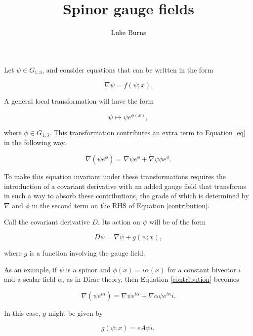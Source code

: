 \documentclass{article}
\title{Spinor gauge fields}
\author{Luke Burns}
\begin{document}
\maketitle

Let $\psi \in G_{1,3}$, and consider equations that can be written in the form

\begin{equation}
  \nabla \psi = f(\psi; x).\label{eq}
\end{equation}

A general local transformation will have the form

\begin{equation}
  \psi \mapsto \psi e^{\phi(x)},\label{transform}
\end{equation}

where $\phi \in G_{1,3}$. This transformation contributes an extra term to Equation \ref{eq} in the following way.

\begin{equation}
  \nabla (\psi e^{\phi}) = \nabla \psi e^{\phi} + \dot \nabla \psi \dot \phi e^{\phi}.\label{contribution}
\end{equation}

To make this equation invariant under these transformations requires the introduction of a covariant derivative with an added gauge field that transforms in such a way to absorb these contributions, the grade of which is determined by $\nabla$ and $\phi$ in the second term on the RHS of Equation \ref{contribution}.

Call the covariant derivative $D$. Its action on $\psi$ will be of the form

\begin{equation}
  D \psi = \nabla \psi + g(\psi; x),\label{covariant-derivative}
\end{equation}

where $g$ is a function involving the gauge field.

As an example, if $\psi$ is a spinor and $\phi(x) = i \alpha(x)$ for a constant bivector $i$ and a scalar field $\alpha$, as in Dirac theory, then Equation \ref{contribution} becomes

\begin{equation}
  \nabla (\psi e^{i \alpha}) = \nabla \psi e^{i \alpha} + \nabla \alpha \psi e^{i \alpha} i.\label{bivector-contribution}
\end{equation}

In this case, $g$ might be given by

\begin{equation}
  g(\psi; x) = e A \psi i,
\end{equation}
\end{document}
